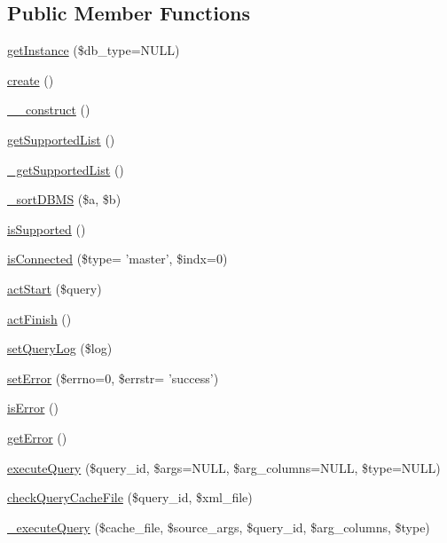 \subsection*{Public Member Functions}
\begin{DoxyCompactItemize}
\item 
\hyperlink{classDB_a36df3da4b06cd9d45feccb6b82e612c8}{get\-Instance} (\$db\-\_\-type=N\-U\-L\-L)
\item 
\hyperlink{classDB_aad22e845daa75ae9ca9b97f7e3a89749}{create} ()
\item 
\hyperlink{classDB_a0624507cfbb6aa27bba9d4c64fbad01d}{\-\_\-\-\_\-construct} ()
\item 
\hyperlink{classDB_a82226ac3fc6365c0771b13e389d216cf}{get\-Supported\-List} ()
\item 
\hyperlink{classDB_a7b0d1af98d9f53968631ca789d6d755c}{\-\_\-get\-Supported\-List} ()
\item 
\hyperlink{classDB_ab0a6d97fa16de74b4d991c9a4d633718}{\-\_\-sort\-D\-B\-M\-S} (\$a, \$b)
\item 
\hyperlink{classDB_a7517481bc9d24ad659f8d347688e481b}{is\-Supported} ()
\item 
\hyperlink{classDB_a217cc2096613d1758a9851f1dd990d71}{is\-Connected} (\$type= 'master', \$indx=0)
\item 
\hyperlink{classDB_a51a1ba94763a8211495eac18d74c80bb}{act\-Start} (\$query)
\item 
\hyperlink{classDB_a79cad647912ef780e967819e6346a742}{act\-Finish} ()
\item 
\hyperlink{classDB_a0adb7f453d6e8ed2e491d6708be7f9ec}{set\-Query\-Log} (\$log)
\item 
\hyperlink{classDB_af2584546ee78d07a40cc16493f8797cc}{set\-Error} (\$errno=0, \$errstr= 'success')
\item 
\hyperlink{classDB_ab1433763c6378f1085606424a1bfe27c}{is\-Error} ()
\item 
\hyperlink{classDB_a3956fe8725f824d8c0a4f3cba449d6df}{get\-Error} ()
\item 
\hyperlink{classDB_a4541040cbc3f33b059bafd66f8cb0ada}{execute\-Query} (\$query\-\_\-id, \$args=N\-U\-L\-L, \$arg\-\_\-columns=N\-U\-L\-L, \$type=N\-U\-L\-L)
\item 
\hyperlink{classDB_a0bbeb84cee13c54916b7f9aac6db4791}{check\-Query\-Cache\-File} (\$query\-\_\-id, \$xml\-\_\-file)
\item 
\hyperlink{classDB_abb9920613c642481dc4c7b5f6f8fe9b2}{\-\_\-execute\-Query} (\$cache\-\_\-file, \$source\-\_\-args, \$query\-\_\-id, \$arg\-\_\-columns, \$type)

\end{DoxyCompactItemize}
